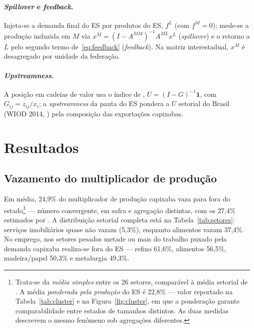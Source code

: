 \documentclass[11pt,a4paper]{article}
\begin{document}
\paragraph{\emph{Spillover} e \emph{feedback}.}
Injeta-se a demanda final do ES por produtos do ES, $f^{L}$ (com $f^{M}=0$);
mede-se a produção induzida em $M$ via
$x^{M}=(I-A^{MM})^{-1}A^{ML}x^{L}$ (\emph{spillover}) e o retorno a $L$ pelo
segundo termo de~\eqref{eq:feedback} (\emph{feedback}). Na matriz interestadual,
$x^{M}$ é desagregado por unidade da federação.

\paragraph{\emph{Upstreamness}.}
A posição em cadeias de valor usa o índice de \citet{antras2012measuring},
$U=(I-G)^{-1}\mathbf{1}$, com $G_{ij}=z_{ij}/x_i$; a \emph{upstreamness} da
pauta do ES pondera a $U$ setorial do Brasil (WIOD 2014, \citealp{timmer2015wiod})
pela composição das
exportações capixabas.

\section{Resultados}
\label{sec:resultados}

\subsection{Vazamento do multiplicador de produção}
Em média, 24,9\% do multiplicador de produção capixaba vaza para fora do
estado\footnote{Trata-se da \emph{média simples} entre os 26 setores,
comparável à média setorial de \citet{haddad2017iioas}. A média
\emph{ponderada pela produção} do ES é 22,8\% --- valor reportado na
Tabela~\ref{tab:cluster} e na Figura~\ref{fig:cluster}, em que a ponderação
garante comparabilidade entre estados de tamanhos distintos. As duas medidas
descrevem o mesmo fenômeno sob agregações diferentes.} --- número convergente,
em safra e agregação distintas, com os 27,4\% estimados por
\citet{haddad2017iioas}. A distribuição setorial completa está na
Tabela~\ref{tab:setores}: serviços imobiliários quase não vazam (5,3\%),
enquanto alimentos vazam 37,4\%. No emprego, nos setores pesados metade ou
mais do trabalho puxado pela demanda capixaba realiza-se fora do ES --- refino
61,6\%, alimentos 56,5\%, madeira/papel 50,3\% e metalurgia 49,3\%.

\begin{table}[htbp]
\centering\small

\caption{Multiplicador de produção ($O_j$), vazamentos de produção e de emprego e
ligações de Rasmussen-Hirschman dos 26 setores do ES, ordenados pelo vazamento do
multiplicador de produção. Vazamento médio: simples 24,9\% (comparável a
\citealp{haddad2017iioas}); ponderado pela produção 22,9\% (bi-regional; 22,8\% na
matriz interestadual, Tabela~\ref{tab:cluster}). Fonte: \texttt{12\_tab\_setores.py}
sobre \texttt{outputs/es\_setores\_resultados.csv}.}
\label{tab:setores}
\end{table}
\end{document}
